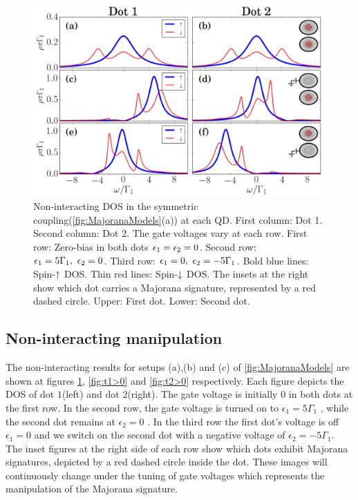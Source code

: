 \begin{figure}[H]
    \begin{center}
    \includegraphics[scale=0.36]{IMAGES/GreenResults/t1=t2.png}
    \caption{ \label{fig:t1=t2}  Non-interacting DOS in the symmetric coupling(\ref{fig:MajoranaModels}(a)) at each QD. First column: Dot 1. Second column: Dot 2. The gate voltages vary at each row.  First row: Zero-bias in both dots $\epsilon_1=\epsilon_2=0$. Second row: $\epsilon_1=5\Gamma_1, \ \epsilon_2 =0$.  Third row: $\epsilon_1=0, \ \epsilon_2 =-5\Gamma_1$.  Bold blue lines: Spin-$\uparrow$ DOS. Thin red lines: Spin-$\downarrow$ DOS. The insets at the right show which dot carries a Majorana signature, represented by a red dashed circle. Upper: First dot. Lower: Second dot. \protect\Source{}
    }
    \end{center}
\end{figure}

\subsection{Non-interacting manipulation}

 The non-interacting results for setups (a),(b) and (c) of \ref{fig:MajoranaModels} are shown at figures \ref{fig:t1=t2}, \ref{fig:t1>0} and \ref{fig:t2>0} respectively. Each figure depicts the DOS of dot $1$(left) and dot $2$(right). The gate voltage is initially $0$ in both dots at the first row. In the second row, the gate voltage is turned on to  $\epsilon_1 = 5\Gamma_1$ , while the second dot remains at $\epsilon_2 = 0$ . In the third row the first dot's voltage is off $\epsilon_1=0$ and we switch on the second dot with a negative voltage of $\epsilon_2 = -5\Gamma_1$. The inset figures at the right side of each row show which dots exhibit Majorana signatures, depicted by a red dashed circle inside the dot. These images will continuously change under the tuning of gate voltages which represents the manipulation of the Majorana signature.




